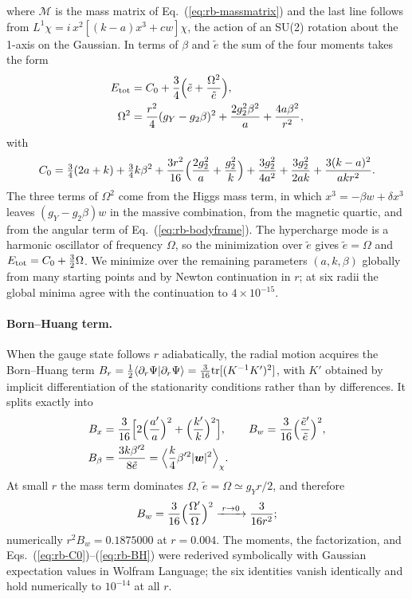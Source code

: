 where $\mathcal M$ is the mass matrix of Eq.~(\ref{eq:rb-massmatrix}) and the last line follows from $L^1\chi=i\,x^2[(k-a)x^3+cw]\chi$, the action of an SU(2) rotation about the 1-axis on the Gaussian.
In terms of $\beta$ and $\tilde e$ the sum of the four moments takes the form
\begin{align}
E_{\rm tot}&=C_0+\frac34\Bigl(\tilde e+\frac{\Omega^2}{\tilde e}\Bigr),\nonumber\\
\Omega^2&=\frac{r^2}{4}(g_Y-g_2\beta)^2+\frac{2g_2^2\beta^2}{a}+\frac{4a\beta^2}{r^2},
\label{eq:rb-Etot}
\end{align}
with
\begin{equation}
C_0=\tfrac34(2a+k)+\tfrac34k\beta^2+\frac{3r^2}{16}\Bigl(\frac{2g_2^2}{a}+\frac{g_2^2}{k}\Bigr)+\frac{3g_2^2}{4a^2}+\frac{3g_2^2}{2ak}+\frac{3(k-a)^2}{akr^2}.
\label{eq:rb-C0}
\end{equation}
The three terms of $\Omega^2$ come from the Higgs mass term, in which $x^3=-\beta w+\delta x^3$ leaves $(g_Y-g_2\beta)w$ in the massive combination, from the magnetic quartic, and from the angular term of Eq.~(\ref{eq:rb-bodyframe}).
The hypercharge mode is a harmonic oscillator of frequency $\Omega$, so the minimization over $\tilde e$ gives $\tilde e=\Omega$ and $E_{\rm tot}=C_0+\frac32\Omega$.
We minimize over the remaining parameters $(a,k,\beta)$ globally from many starting points and by Newton continuation in $r$; at six radii the global minima agree with the continuation to $4\times10^{-15}$. %

\paragraph{Born--Huang term.}
When the gauge state follows $r$ adiabatically, the radial motion acquires the Born--Huang term $B_r=\frac12\langle\partial_r\Psi|\partial_r\Psi\rangle=\frac{3}{16}{\rm tr}[(K^{-1}K')^2]$, with $K'$ obtained by implicit differentiation of the stationarity conditions rather than by differences.
It splits exactly into
\begin{align}
B_x&=\frac{3}{16}\Bigl[2\Bigl(\frac{a'}{a}\Bigr)^2+\Bigl(\frac{k'}{k}\Bigr)^2\Bigr],\qquad
B_w=\frac{3}{16}\Bigl(\frac{\tilde e'}{\tilde e}\Bigr)^2,\nonumber\\
B_\beta&=\frac{3k\beta'^2}{8\tilde e}=\Bigl\langle\frac k4\beta'^2|\bm w|^2\Bigr\rangle_\chi .
\label{eq:rb-BH}
\end{align}
At small $r$ the mass term dominates $\Omega$, $\tilde e=\Omega\simeq g_Yr/2$, and therefore
\begin{equation}
B_w=\frac{3}{16}\Bigl(\frac{\Omega'}{\Omega}\Bigr)^2\xrightarrow{\;r\to0\;}\frac{3}{16r^2};
\label{eq:rb-Bw}
\end{equation}
numerically $r^2B_w=0.1875000$ at $r=0.004$. %
The moments, the factorization, and Eqs.~(\ref{eq:rb-C0})--(\ref{eq:rb-BH}) were rederived symbolically with Gaussian expectation values in Wolfram Language; the six identities vanish identically and hold numerically to $10^{-14}$ at all $r$. %

